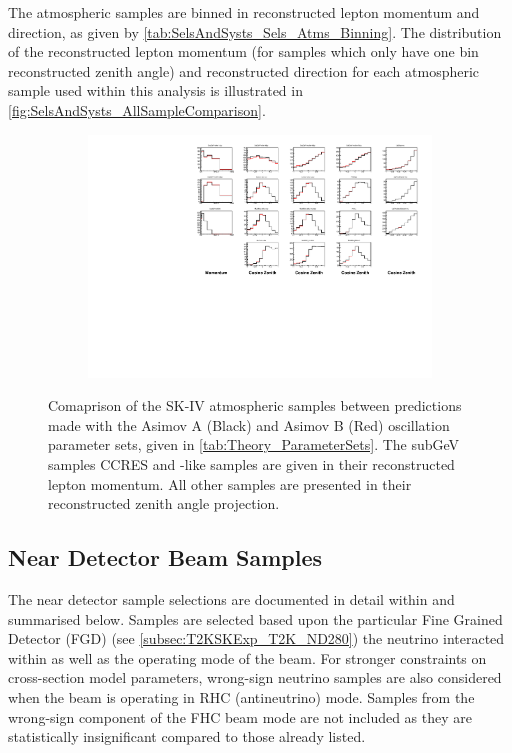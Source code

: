 The atmospheric samples are binned in reconstructed lepton momentum and direction, as given by \autoref{tab:SelsAndSysts_Sels_Atms_Binning}. The distribution of the reconstructed lepton momentum (for samples which only have one bin reconstructed zenith angle) and reconstructed direction for each atmospheric sample used within this analysis is illustrated in \autoref{fig:SelsAndSysts_AllSampleComparison}.

\begin{figure}
  \centering
  \begin{subfigure}[t]{\textwidth}
    \includegraphics[width=\textwidth, trim={0mm 0mm 0mm 0mm}, clip,page=1]{Figures/Selections/HistogramComparison.pdf}
  \end{subfigure}
  \caption{Comaprison of the SK-IV atmospheric samples between predictions made with the Asimov A (Black) and Asimov B (Red) oscillation parameter sets, given in \autoref{tab:Theory_ParameterSets}. The subGeV samples CCRES and -like samples are given in their reconstructed lepton momentum. All other samples are presented in their reconstructed zenith angle projection.}
  \label{fig:SelsAndSysts_AllSampleComparison}
\end{figure}

\clearpage
\subsection{Near Detector Beam Samples}
\label{sec:SelsAndSysts_Sels_ND}

The near detector sample selections are documented in detail within \cite{t2k_tn_395} and summarised below. Samples are selected based upon the particular Fine Grained Detector (FGD) (see \autoref{subsec:T2KSKExp_T2K_ND280}) the neutrino interacted within as well as the operating mode of the beam. For stronger constraints on cross-section model parameters, wrong-sign neutrino samples are also considered when the beam is operating in RHC (antineutrino) mode. Samples from the wrong-sign component of the FHC beam mode are not included as they are statistically insignificant compared to those already listed.

